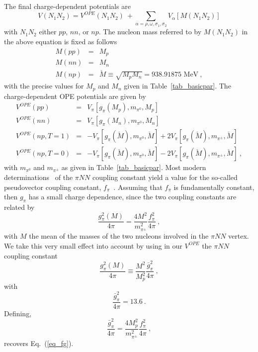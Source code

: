 The final charge-dependent potentials are
\begin{equation}
V (N_1N_2) = V^{OPE} (N_1N_2) \
+ \sum_{\alpha = \rho, \omega, \sigma_1, \sigma_2} 
    V_\alpha [M(N_1N_2)]
\label{eq_pot}
\end{equation}
with $N_1 N_2$ either $pp$, $nn$, or $np$.
The nucleon mass referred to by $M(N_1N_2)$ in the above equation
is fixed as follows
\begin{eqnarray}
M(pp) & = & M_p \\
M(nn) & = & M_n \\
M(np) & = & \check{M} \equiv \sqrt{M_pM_n} = 938.91875 \mbox{ MeV}
\label{eq_mav}
\: ,
\end{eqnarray}
with the precise values for $M_p$ and $M_n$ 
given in Table~\ref{tab_basicpar}.
The charge-dependent OPE potentials are given by
\begin{eqnarray}
V^{OPE}(pp) & = & V_{\pi}[g_{\pi}(M_p), m_{\pi^0}, M_p] 
\label{eq_opepp}
\\
V^{OPE}(nn) & = & V_{\pi}[g_{\pi}(M_n), m_{\pi^0}, M_n] \\
V^{OPE}(np, T=1) & = & 
- V_{\pi}[g_{\pi}(\check{M}), m_{\pi^0}, \check{M}]
+2V_{\pi}[g_{\pi}(\check{M}), m_{\pi^\pm}, \check{M}] 
\label{eq_openp1}
\\
V^{OPE}(np, T=0) & = & 
- V_{\pi}[g_{\pi}(\check{M}), m_{\pi^0}, \check{M}]
-2V_{\pi}[g_{\pi}(\check{M}), m_{\pi^\pm}, \check{M}]
\: ,
\end{eqnarray}
with $m_{\pi^0}$ and $m_{\pi^\pm}$
as given in Table~\ref{tab_basicpar}.
Most modern determinations~\cite{STS93} of the $\pi NN$ coupling constant
yield a value for the so-called pseudovector coupling constant,
$f_\pi$~\cite{Dum83}. Assuming that $f_\pi$ is fundamentally constant,
then $g_\pi$ has a small charge dependence, since
the two coupling constants are related by
\begin{equation}
\frac{g^2_\pi(M)}{4\pi} 
= \frac{4M^2}{m_{\pi^\pm}^2}
\frac{f^2_\pi}{4\pi} 
\: ,
\label{eq_fg}
\end{equation}
with $M$ the mean of the masses of the two nucleons involved in
the $\pi NN$ vertex.
We take this very small effect into account by using
in our $V^{OPE}$ the $\pi NN$ coupling constant
\begin{equation}
\frac{g^2_\pi(M)}{4\pi} 
\equiv \frac{M^2}{M_p^2}
\frac{\bar{g}^2_\pi}{4\pi} 
\: ,
\end{equation}
with
\begin{equation}
\frac{\bar{g}^2_\pi}{4\pi} 
= 13.6
\: .
\end{equation}
Defining,
\begin{equation}
\frac{\bar{g}^2_\pi}{4\pi} 
= \frac{4M_p^2}{m_{\pi^\pm}^2}
\frac{f^2_\pi}{4\pi} 
\: ,
\end{equation}
recovers Eq.~(\ref{eq_fg}).



